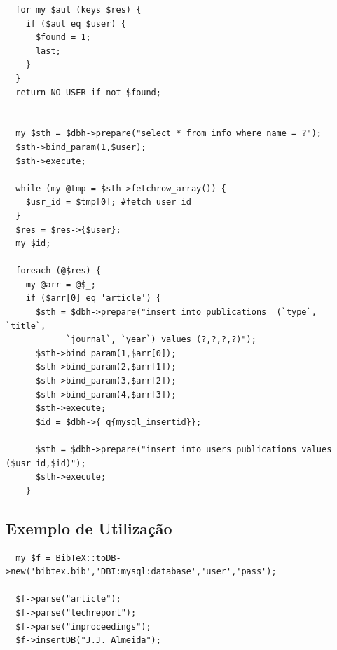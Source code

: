 \documentclass[a4paper,11pt,openright,openbib]{article}
\begin{document}
\begin{verbatim}
  for my $aut (keys $res) {
    if ($aut eq $user) {
      $found = 1;
      last;
    }
  }
  return NO_USER if not $found;


  my $sth = $dbh->prepare("select * from info where name = ?");
  $sth->bind_param(1,$user);
  $sth->execute;

  while (my @tmp = $sth->fetchrow_array()) {
    $usr_id = $tmp[0]; #fetch user id
  }
  $res = $res->{$user};
  my $id;

  foreach (@$res) {   
    my @arr = @$_;      
    if ($arr[0] eq 'article') {
      $sth = $dbh->prepare("insert into publications  (`type`, `title`, 
            `journal`, `year`) values (?,?,?,?)");
      $sth->bind_param(1,$arr[0]);
      $sth->bind_param(2,$arr[1]);
      $sth->bind_param(3,$arr[2]);
      $sth->bind_param(4,$arr[3]);            
      $sth->execute;
      $id = $dbh->{ q{mysql_insertid}};

      $sth = $dbh->prepare("insert into users_publications values ($usr_id,$id)");
      $sth->execute;
    }
\end{verbatim}
  

\subsection{Exemplo de Utilização}

\begin{verbatim}
  my $f = BibTeX::toDB->new('bibtex.bib','DBI:mysql:database','user','pass');

  $f->parse("article");
  $f->parse("techreport");
  $f->parse("inproceedings");
  $f->insertDB("J.J. Almeida");
\end{verbatim}
\end{document}
